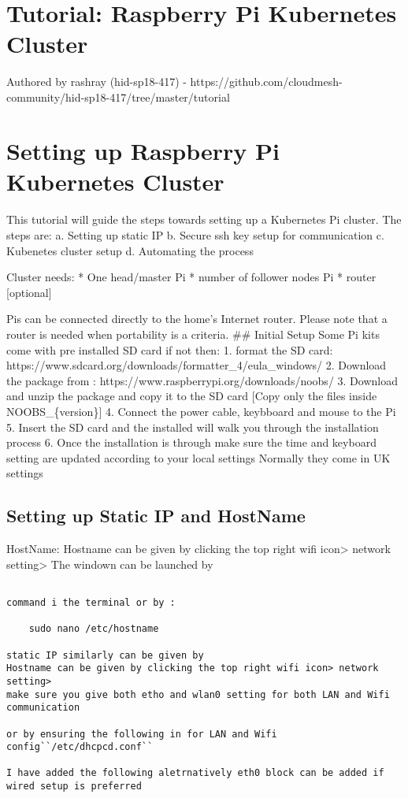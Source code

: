 \MDNAME\

\section{Tutorial: Raspberry Pi Kubernetes Cluster}

Authored by rashray (hid-sp18-417) -
https://github.com/cloudmesh-community/hid-sp18-417/tree/master/tutorial

\section{Setting up Raspberry Pi Kubernetes Cluster}

This tutorial will guide the steps towards setting up a Kubernetes Pi
cluster. The steps are: a. Setting up static IP b. Secure ssh key setup
for communication c. Kubenetes cluster setup d. Automating the process

Cluster needs: * One head/master Pi * number of follower nodes Pi *
router {[}optional{]}

Pis can be connected directly to the home's Internet router. Please note
that a router is needed when portability is a criteria. \#\# Initial
Setup Some Pi kits come with pre installed SD card if not then: 1.
format the SD card:
https://www.sdcard.org/downloads/formatter\_4/eula\_windows/ 2. Download
the package from : https://www.raspberrypi.org/downloads/noobs/ 3.
Download and unzip the package and copy it to the SD card {[}Copy only
the files inside NOOBS\_\{version\}{]} 4. Connect the power cable,
keybboard and mouse to the Pi 5. Insert the SD card and the installed
will walk you through the installation process 6. Once the installation
is through make sure the time and keyboard setting are updated according
to your local settings Normally they come in UK settings

\subsection{Setting up Static IP and HostName}

HostName: Hostname can be given by clicking the top right wifi
icon\textgreater{} network setting\textgreater{} The windown can be
launched by

\begin{lstlisting}

command i the terminal or by :

    sudo nano /etc/hostname

static IP similarly can be given by
Hostname can be given by clicking the top right wifi icon> network setting>
make sure you give both etho and wlan0 setting for both LAN and Wifi communication

or by ensuring the following in for LAN and Wifi config``/etc/dhcpcd.conf``

I have added the following aletrnatively eth0 block can be added if wired setup is preferred
\end{lstlisting}

